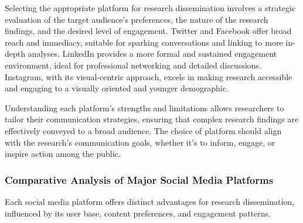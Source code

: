 \documentclass[
]{book}
\begin{document}
Selecting the appropriate platform for research dissemination involves a strategic evaluation of the target audience's preferences, the nature of the research findings, and the desired level of engagement. Twitter and Facebook offer broad reach and immediacy, suitable for sparking conversations and linking to more in-depth analyses. LinkedIn provides a more formal and sustained engagement environment, ideal for professional networking and detailed discussions. Instagram, with its visual-centric approach, excels in making research accessible and engaging to a visually oriented and younger demographic.

Understanding each platform's strengths and limitations allows researchers to tailor their communication strategies, ensuring that complex research findings are effectively conveyed to a broad audience. The choice of platform should align with the research's communication goals, whether it's to inform, engage, or inspire action among the public.

\hypertarget{comparative-analysis-of-major-social-media-platforms}{%
\subsubsection*{Comparative Analysis of Major Social Media Platforms}\label{comparative-analysis-of-major-social-media-platforms}}

Each social media platform offers distinct advantages for research dissemination, influenced by its user base, content preferences, and engagement patterns.
\end{document}
